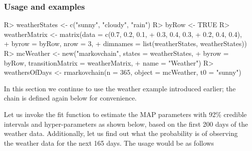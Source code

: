 \documentclass[
  nojss]{jss}
\begin{document}
\subsubsection{Usage and examples}\label{usage-and-examples}

\begin{CodeChunk}
\begin{CodeInput}
R> weatherStates <- c("sunny", "cloudy", "rain")
R> byRow <- TRUE
R> weatherMatrix <- matrix(data = c(0.7, 0.2, 0.1, 
+                                  0.3, 0.4, 0.3, 
+                                  0.2, 0.4, 0.4), 
+                         byrow = byRow, nrow = 3, 
+                         dimnames = list(weatherStates, weatherStates))
R> mcWeather <- new("markovchain", states = weatherStates, 
+                  byrow = byRow, transitionMatrix = weatherMatrix, 
+                  name = "Weather")      
R> weathersOfDays <- rmarkovchain(n = 365, object = mcWeather, t0 = "sunny")
\end{CodeInput}
\end{CodeChunk}

In this section we continue to use the weather example introduced earlier; the chain is defined again below for convenience.

Let us invoke the fit function to estimate the MAP parameters with 92\% credible intervals and hyper-parameters as shown below, based on the first 200 days of the weather data. Additionally, let us find out what the probability is of observing the weather data for the next 165 days. The usage would be as follows
\end{document}
